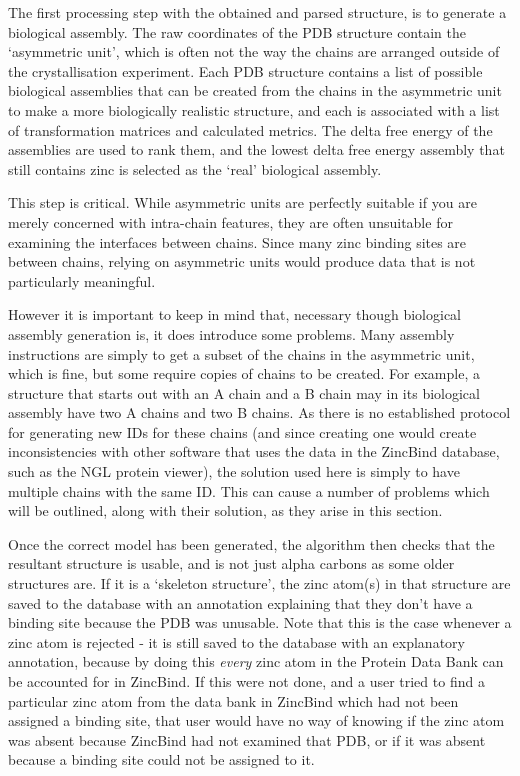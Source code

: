 The first processing step with the obtained and parsed structure, is to generate a biological assembly. The raw coordinates of the PDB structure contain the `asymmetric unit', which is often not the way the chains are arranged outside of the crystallisation experiment. Each PDB structure contains a list of possible biological assemblies that can be created from the chains in the asymmetric unit to make a more biologically realistic structure, and each is associated with a list of transformation matrices and calculated metrics. The delta free energy of the assemblies are used to rank them, and the lowest delta free energy assembly that still contains zinc is selected as the `real' biological assembly.

This step is critical. While asymmetric units are perfectly suitable if you are merely concerned with intra-chain features, they are often unsuitable for examining the interfaces between chains. Since many zinc binding sites are between chains, relying on asymmetric units would produce data that is not particularly meaningful.

However it is important to keep in mind that, necessary though biological assembly generation is, it does introduce some problems. Many assembly instructions are simply to get a subset of the chains in the asymmetric unit, which is fine, but some require copies of chains to be created. For example, a structure that starts out with an A chain and a B chain may in its biological assembly have two A chains and two B chains. As there is no established protocol for generating new IDs for these chains (and since creating one would create inconsistencies with other software that uses the data in the ZincBind database, such as the NGL protein viewer), the solution used here is simply to have multiple chains with the same ID. This can cause a number of problems which will be outlined, along with their solution, as they arise in this section.

Once the correct model has been generated, the algorithm then checks that the resultant structure is usable, and is not just alpha carbons as some older structures are. If it is a `skeleton structure', the zinc atom(s) in that structure are saved to the database with an annotation explaining that they don't have a binding site because the PDB was unusable. Note that this is the case whenever a zinc atom is rejected - it is still saved to the database with an explanatory annotation, because by doing this \emph{every} zinc atom in the Protein Data Bank can be accounted for in ZincBind. If this were not done, and a user tried to find a particular zinc atom from the data bank in ZincBind which had not been assigned a binding site, that user would have no way of knowing if the zinc atom was absent because ZincBind had not examined that PDB, or if it was absent because a binding site could not be assigned to it.

